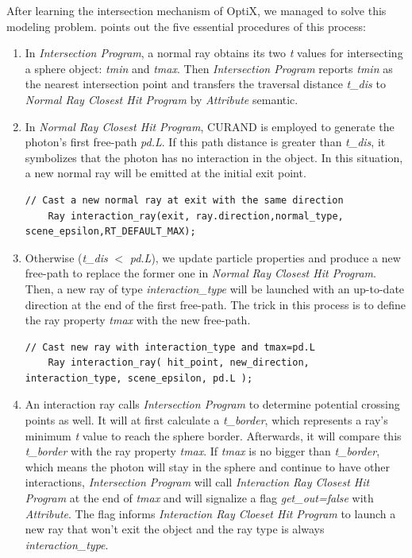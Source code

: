 After learning the intersection mechanism of OptiX, we managed to solve this modeling problem.  points out the five essential procedures of this process:
\begin{enumerate}
  \item{
In \textit{Intersection Program}, a normal ray obtains its two \textit{t} values for intersecting a sphere object: \textit{tmin} and \textit{tmax}. Then \textit{Intersection Program} reports \textit{tmin} as the nearest intersection point and transfers the traversal distance \textit{t\_dis} to \textit{Normal Ray Closest Hit Program} by \textit{Attribute} semantic.
  }
  \item{
In \textit{Normal Ray Closest Hit Program}, CURAND is employed to generate the photon's first free-path \textit{pd.L}. If this path distance is greater than \textit{t\_dis}, it symbolizes that the photon has no interaction in the object. In this situation, a new normal ray will be emitted at the initial exit point.
\begin{lstlisting}[mathescape]
    // Cast a new normal ray at exit with the same direction
    Ray interaction_ray(exit, ray.direction,normal_type, scene_epsilon,RT_DEFAULT_MAX);
\end{lstlisting}
  }
  \item{
Otherwise (\textit{t\_dis} $<$ \textit{pd.L}), we update particle properties and produce a new free-path to replace the former one in \textit{Normal Ray Closest Hit Program}. Then, a new ray of type \textit{interaction\_type} will be launched with an up-to-date direction at the end of the first free-path. The trick in this process is to define the ray property \textit{tmax} with the new free-path.  
\begin{lstlisting}[mathescape]
    // Cast new ray with interaction_type and tmax=pd.L 
    Ray interaction_ray( hit_point, new_direction, interaction_type, scene_epsilon, pd.L );
\end{lstlisting}
  }
  \item{
An interaction ray calls \textit{Intersection Program} to determine potential crossing points as well. It will at first calculate a \textit{t\_border}, which represents a ray's minimum \textit{t} value to reach the sphere border. Afterwards, it will compare this \textit{t\_border} with the ray property \textit{tmax}. If \textit{tmax} is no bigger than \textit{t\_border}, which means the photon will stay in the sphere and continue to have other interactions, \textit{Intersection Program} will call \textit{Interaction Ray Closest Hit Program} at the end of \textit{tmax} and will signalize a flag \textit{get\_out=false} with \textit{Attribute}. The flag informs \textit{Interaction Ray Cloeset Hit Program} to launch a new ray that won't exit the object and the ray type is always \textit{interaction\_type}.
}
\end{enumerate}
